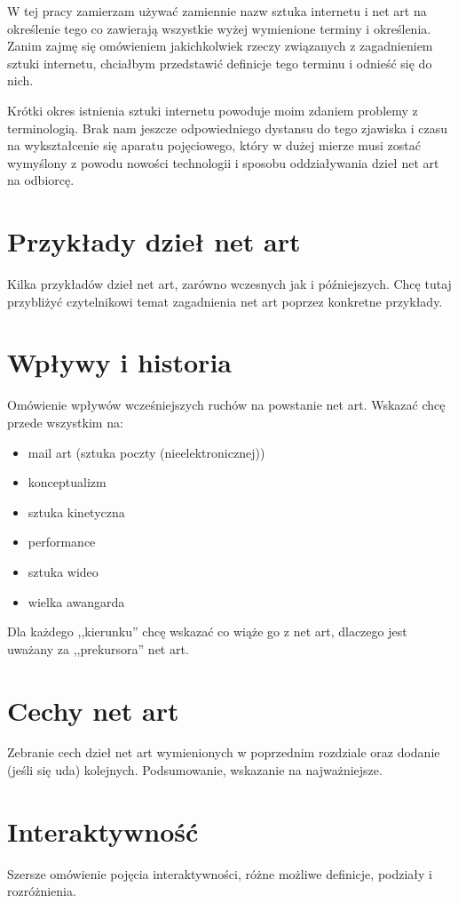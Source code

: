 \documentclass[a4paper,12pt]{article}
\begin{document}
W tej pracy zamierzam używać zamiennie nazw sztuka internetu i net art
na określenie tego co zawierają wszystkie wyżej wymienione terminy
i określenia. Zanim zajmę się omówieniem jakichkolwiek rzeczy związanych
z zagadnieniem sztuki internetu, chciałbym przedstawić definicje
tego terminu i odnieść się do nich.

Krótki okres istnienia sztuki internetu powoduje moim zdaniem problemy
z terminologią. Brak nam jeszcze odpowiedniego dystansu do tego zjawiska
i czasu na wykształcenie się aparatu pojęciowego, który w dużej mierze
musi zostać wymyślony z powodu nowości technologii i sposobu oddziaływania
dzieł net art na odbiorcę.

\section{Przykłady dzieł net art}
Kilka przykładów dzieł net art, zarówno wczesnych jak i późniejszych.
Chcę tutaj przybliżyć czytelnikowi temat zagadnienia net art poprzez
konkretne przykłady.

\section{Wpływy i historia}
Omówienie wpływów wcześniejszych ruchów na powstanie net art.
Wskazać chcę przede wszystkim na:
\begin{itemize}
\item mail art (sztuka poczty (nieelektronicznej))
\item konceptualizm
\item sztuka kinetyczna
\item performance
\item sztuka wideo
\item wielka awangarda
\end{itemize}
Dla każdego ,,kierunku'' chcę wskazać co wiąże go z net art,
dlaczego jest uważany za ,,prekursora'' net art.

\section{Cechy net art}
Zebranie cech dzieł net art wymienionych
w poprzednim rozdziale oraz dodanie (jeśli się uda) kolejnych.
Podsumowanie, wskazanie na najważniejsze.

\section{Interaktywność}
Szersze omówienie pojęcia interaktywności, różne możliwe
definicje, podziały i rozróżnienia.
\end{document}

